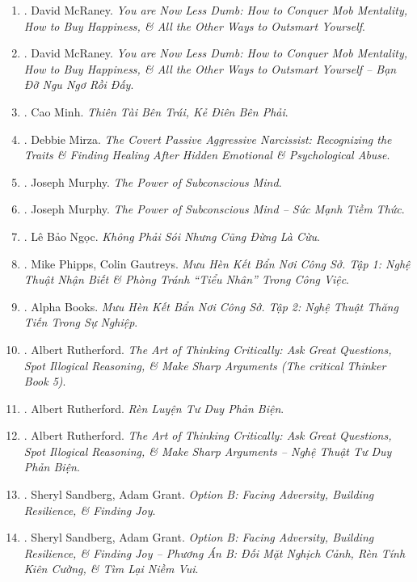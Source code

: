 \documentclass{article}
\begin{document}
\begin{enumerate}
	\item \cite{McRaney_less_stupid}. {\sc David McRaney}. {\it You are Now Less Dumb: How to Conquer Mob Mentality, How to Buy Happiness, \& All the Other Ways to Outsmart Yourself}.
	\item \cite{McRaney_less_stupid_VN}. {\sc David McRaney}. {\it You are Now Less Dumb: How to Conquer Mob Mentality, How to Buy Happiness, \& All the Other Ways to Outsmart Yourself -- Bạn Đỡ Ngu Ngơ Rồi Đấy}.\hfill{\sf[done]}
	\item \cite{Minh2022}. Cao Minh. {\it Thiên Tài Bên Trái, Kẻ Điên Bên Phải}.\hfill{\sf[done]}
	\item \cite{Mirza2017}. Debbie Mirza. {\it The Covert Passive Aggressive Narcissist: Recognizing the Traits \& Finding Healing After Hidden Emotional \& Psychological Abuse}.\hfill{\sf[done]}
	\item \cite{Murphy_subconscious}. {\sc Joseph Murphy}. {\it The Power of Subconscious Mind}.\hfill{\sf[reading]}
	\item \cite{Murphy_subconscious_VN}. {\sc Joseph Murphy}. {\it The Power of Subconscious Mind -- Sức Mạnh Tiềm Thức}.\hfill{\sf[done]}
	\item \cite{Ngoc2022}. Lê Bảo Ngọc. {\it Không Phải Sói Nhưng Cũng Đừng Là Cừu}.\hfill{\sf[done]}
	\item \cite{Phipps_Gautreys_muu_hen_ke_ban_tap_1}. Mike Phipps, Colin Gautreys. {\it Mưu Hèn Kết Bẩn Nơi Công Sở. Tập 1: Nghệ Thuật Nhận Biết \& Phòng Tránh ``Tiểu Nhân'' Trong Công Việc}.\hfill{\sf[done]}
	\item \cite{muu_hen_ke_ban_tap_2}. Alpha Books. {\it Mưu Hèn Kết Bẩn Nơi Công Sở. Tập 2: Nghệ Thuật Thăng Tiến Trong Sự Nghiệp}.\hfill{\sf[done]}
	\item \cite{Rutherford2020}. Albert Rutherford. {\it The Art of Thinking Critically: Ask Great Questions, Spot Illogical Reasoning, \& Make Sharp Arguments (The critical Thinker Book 5)}.\hfill{\sf[reading]}
	\item \cite{Rutherford2022}. Albert Rutherford. {\it Rèn Luyện Tư Duy Phản Biện}.\hfill{\sf[done]}
	\item \cite{Rutherford2023}. Albert Rutherford. {\it The Art of Thinking Critically: Ask Great Questions, Spot Illogical Reasoning, \& Make Sharp Arguments -- Nghệ Thuật Tư Duy Phản Biện}.\hfill{\sf[done]}
	\item \cite{Sandberg_Grant2017}. Sheryl Sandberg, Adam Grant. {\it Option B: Facing Adversity, Building Resilience, \& Finding Joy}.\hfill{\sf[reading]}
	\item \cite{Sandberg_Grant2019}. Sheryl Sandberg, Adam Grant. {\it Option B: Facing Adversity, Building Resilience, \& Finding Joy -- Phương Án B: Đối Mặt Nghịch Cảnh, Rèn Tính Kiên Cường, \& Tìm Lại Niềm Vui}.\hfill{\sf[done]}

\end{enumerate}
\end{document}
